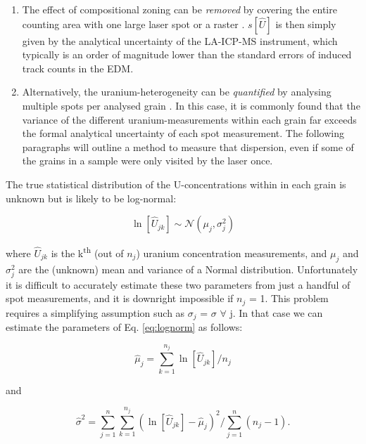 \documentclass{article}
\begin{document}
\begin{enumerate}
  \item The effect of compositional zoning can be \emph{removed} by
    covering the entire counting area with one large laser spot
    \citep{soares2014} or a raster \citep{hasebe2004}. $s[\hat{U}]$ is
    then simply given by the analytical uncertainty of the LA-ICP-MS
    instrument, which typically is an order of magnitude lower than
    the standard errors of induced track counts in the EDM.
\item Alternatively, the uranium-heterogeneity can be
  \emph{quantified} by analysing multiple spots per analysed grain
  \citep{hasebe2009}. In this case, it is commonly found that the
  variance of the different uranium-measurements within each grain far
  exceeds the formal analytical uncertainty of each spot
  measurement. The following paragraphs will outline a method to
  measure that dispersion, even if some of the grains in a sample were
  only visited by the laser once.
\end{enumerate}

The true statistical distribution of the U-concentrations within in
each grain is unknown but is likely to be log-normal:

\begin{equation}
\ln [\hat{U}_{jk}] \sim \mathcal{N}(\mu_j,\sigma_j^2)
\label{eq:lognorm}
\end{equation}

where $\hat{U}_{jk}$ is the k\textsuperscript{th} (out of $n_j$)
uranium concentration measurements, and $\mu_j$ and $\sigma_j^2$ are
the (unknown) mean and variance of a Normal
distribution. Unfortunately it is difficult to accurately estimate
these two parameters from just a handful of spot measurements, and it
is downright impossible if $n_j$ = 1. This problem requires a
simplifying assumption such as $\sigma_j$ = $\sigma$ $\forall$ j. In
that case we can estimate the parameters of Eq. \ref{eq:lognorm}
as follows:

\begin{equation}
\hat{\mu}_j = \sum\limits_{k=1}^{n_j} \ln [\hat{U}_{jk}]/n_j
\end{equation}

and

\begin{equation}
\hat{\sigma}^2 = \sum\limits_{j=1}^{n} \sum\limits_{k=1}^{n_j}
\left( \ln [\hat{U}_{jk}] - \hat{\mu}_j \right)^2 / 
\sum\limits_{j=1}^{n} (n_j - 1).
\end{equation}
\end{document}
